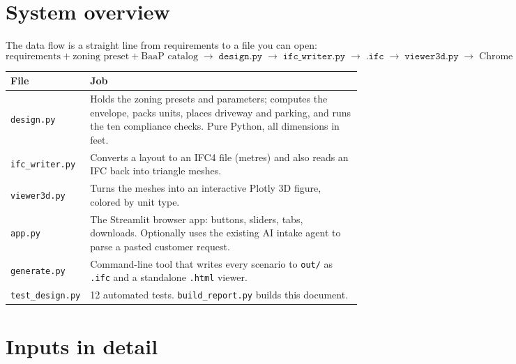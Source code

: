 \documentclass[11pt]{article}
\begin{document}
\section{System overview}
The data flow is a straight line from requirements to a file you can open:
\[
\text{requirements} + \text{zoning preset} + \text{BaaP catalog}
\;\rightarrow\; \texttt{design.py}
\;\rightarrow\; \texttt{ifc\_writer.py}
\;\rightarrow\; \texttt{.ifc}
\;\rightarrow\; \texttt{viewer3d.py}
\;\rightarrow\; \text{Chrome}
\]
\begin{table}[H]\centering\small
\begin{tabular}{@{}lp{10.5cm}@{}}\toprule
File & Job \\ \midrule
\texttt{design.py} & Holds the zoning presets and parameters; computes the envelope, packs units, places driveway and parking, and runs the ten compliance checks. Pure Python, all dimensions in feet. \\
\texttt{ifc\_writer.py} & Converts a layout to an IFC4 file (metres) and also reads an IFC back into triangle meshes. \\
\texttt{viewer3d.py} & Turns the meshes into an interactive Plotly 3D figure, colored by unit type. \\
\texttt{app.py} & The Streamlit browser app: buttons, sliders, tabs, downloads. Optionally uses the existing AI intake agent to parse a pasted customer request. \\
\texttt{generate.py} & Command-line tool that writes every scenario to \texttt{out/} as \texttt{.ifc} and a standalone \texttt{.html} viewer. \\
\texttt{test\_design.py} & 12 automated tests. \texttt{build\_report.py} builds this document. \\ \bottomrule
\end{tabular}\end{table}

\section{Inputs in detail}
\end{document}
